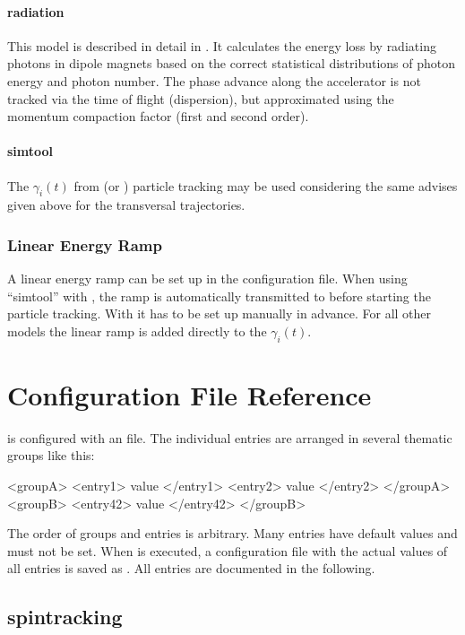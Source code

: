 \documentclass[a4paper]{scrartcl}
\begin{document}
\paragraph{radiation}
This model is described in detail in \cite[section~4.2]{dr}. It
calculates the energy loss by radiating photons in dipole magnets based on the correct
statistical distributions of photon energy and photon number. The phase advance along
the accelerator is not tracked via the time of flight (dispersion), but approximated using
the momentum compaction factor (first and second order).

\paragraph{simtool}
The $\gamma_i(t)$ from \ele (or \madx) particle tracking may be used considering the same advises
given above for the transversal trajectories.



\subsubsection{Linear Energy Ramp}
A linear energy ramp can be set up in the \polem configuration file. When using
 \enquote{simtool} with \ele, the ramp is automatically
transmitted to \ele before starting the particle tracking. With \madx it has to be set up
manually in advance. For all other models the linear ramp is added directly to the
$\gamma_i(t)$.


\clearpage
\section{Configuration File Reference}
\label{sec:config}

\polem is configured with an \xml file. The individual entries are arranged in several
thematic groups like this:
\begin{xmlcode}
  <groupA>
    <entry1> value </entry1>
    <entry2> value </entry2>
  </groupA>
  <groupB>
    <entry42> value </entry42>
  </groupB>
\end{xmlcode}
The order of groups and entries is arbitrary. Many entries have default values and must
not be set. When \polem is executed, a configuration file with the actual values of all
entries is saved as . All entries are
documented in the following.

\subsection{spintracking}
\label{sec:config-spintrk}
\end{document}
